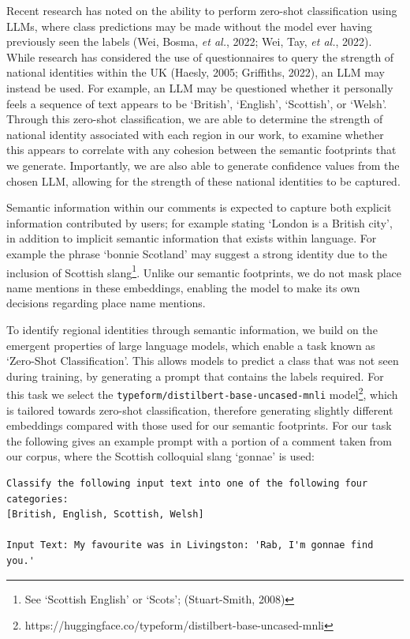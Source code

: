 \documentclass[
]{article}
\begin{document}
Recent research has noted on the ability to perform zero-shot
classification using LLMs, where class predictions may be made without
the model ever having previously seen the labels (Wei, Bosma, \emph{et
al.}, 2022; Wei, Tay, \emph{et al.}, 2022). While research has
considered the use of questionnaires to query the strength of national
identities within the UK (Haesly, 2005; Griffiths, 2022), an LLM may
instead be used. For example, an LLM may be questioned whether it
personally feels a sequence of text appears to be `British', `English',
`Scottish', or `Welsh'. Through this zero-shot classification, we are
able to determine the strength of national identity associated with each
region in our work, to examine whether this appears to correlate with
any cohesion between the semantic footprints that we generate.
Importantly, we are also able to generate confidence values from the
chosen LLM, allowing for the strength of these national identities to be
captured.

Semantic information within our comments is expected to capture both
explicit information contributed by users; for example stating `London
is a British city', in addition to implicit semantic information that
exists within language. For example the phrase `bonnie Scotland' may
suggest a strong identity due to the inclusion of Scottish
slang\footnote{See `Scottish English' or `Scots'; (Stuart-Smith, 2008)}.
Unlike our semantic footprints, we do not mask place name mentions in
these embeddings, enabling the model to make its own decisions regarding
place name mentions.

To identify regional identities through semantic information, we build
on the emergent properties of large language models, which enable a task
known as `Zero-Shot Classification'. This allows models to predict a
class that was not seen during training, by generating a prompt that
contains the labels required. For this task we select the
\texttt{typeform/distilbert-base-uncased-mnli} model\footnote{https://huggingface.co/typeform/distilbert-base-uncased-mnli},
which is tailored towards zero-shot classification, therefore generating
slightly different embeddings compared with those used for our semantic
footprints. For our task the following gives an example prompt with a
portion of a comment taken from our corpus, where the Scottish
colloquial slang `gonnae' is used:

\begin{verbatim}
Classify the following input text into one of the following four categories:
[British, English, Scottish, Welsh]

Input Text: My favourite was in Livingston: 'Rab, I'm gonnae find you.'
\end{verbatim}
\end{document}
